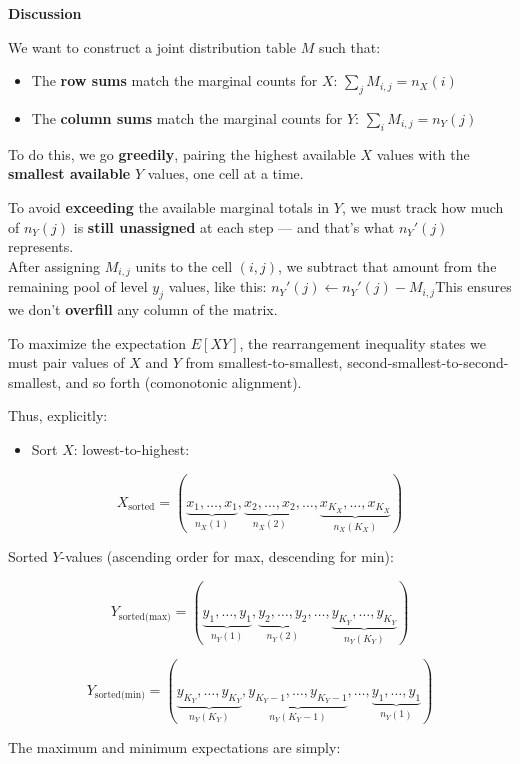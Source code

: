 \documentclass[
  12pt,
]{article}
\providecommand{\tightlist}{%
  \setlength{\itemsep}{0pt}\setlength{\parskip}{0pt}}\usepackage{longtable,booktabs,array}
\theoremstyle{plain}
\theoremstyle{definition}
\theoremstyle{remark}
\begin{document}
\textbf{Discussion}

We want to construct a joint distribution table \(M\) such that:

\begin{itemize}
\item
  The \textbf{row sums} match the marginal counts for \(X\):
  \(\sum_j M_{i,j} = n_X(i)\)
\item
  The \textbf{column sums} match the marginal counts for \(Y\):
  \(\sum_i M_{i,j} = n_Y(j)\)
\end{itemize}

To do this, we go \textbf{greedily}, pairing the highest available \(X\)
values with the \textbf{smallest available} \(Y\) values, one cell at a
time.

To avoid \textbf{exceeding} the available marginal totals in \(Y\), we
must track how much of \(n_Y(j)\) is \textbf{still unassigned} at each
step --- and that's what \(n_Y'(j)\) represents.\\
After assigning \(M_{i,j}\) units to the cell \((i,j)\), we subtract
that amount from the remaining pool of level \(y_j\) values, like this:
\(n_Y'(j) \leftarrow n_Y'(j) - M_{i,j}\)This ensures we don't
\textbf{overfill} any column of the matrix.

To maximize the expectation \(E[XY]\), the rearrangement inequality
states we must pair values of \(X\) and \(Y\) from smallest-to-smallest,
second-smallest-to-second-smallest, and so forth (comonotonic
alignment).

Thus, explicitly:

\begin{itemize}
\tightlist
\item
  Sort \(X\): lowest-to-highest:
\end{itemize}

\[X_{\text{sorted}} = (\underbrace{x_1,\dots,x_1}_{n_X(1)}, \underbrace{x_2,\dots,x_2}_{n_X(2)}, \dots,\underbrace{x_{K_X},\dots,x_{K_X}}_{n_X(K_X)})\]

Sorted \(Y\)-values (ascending order for max, descending for min):

\[Y_{\text{sorted(max)}} = (\underbrace{y_1,\dots,y_1}_{n_Y(1)}, \underbrace{y_2,\dots,y_2}_{n_Y(2)}, \dots,\underbrace{y_{K_Y},\dots,y_{K_Y}}_{n_Y(K_Y)})\]

\[Y_{\text{sorted(min)}} = (\underbrace{y_{K_Y},\dots,y_{K_Y}}_{n_Y(K_Y)}, \underbrace{y_{K_Y-1},\dots,y_{K_Y-1}}_{n_Y(K_Y-1)}, \dots,\underbrace{y_1,\dots,y_1}_{n_Y(1)})\]

The maximum and minimum expectations are simply:
\end{document}
